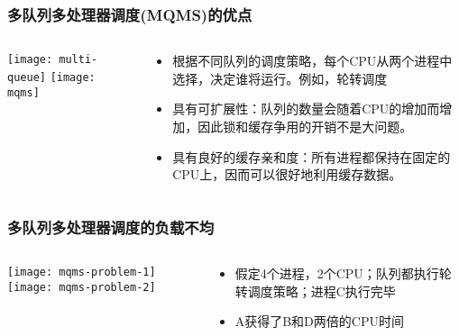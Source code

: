 \begin{frame}
    \frametitle{多队列多处理器调度(MQMS)的优点}
	\begin{columns}
		\begin{column}{.5\textwidth}
			\Large \centering
			\texttt{[image: multi-queue]}
			\texttt{[image: mqms]}	
		\end{column}
		
		\begin{column}{.5\textwidth}
			\large
			\normalsize
			\begin{itemize}
			\item 根据不同队列的调度策略，每个CPU从两个进程中选择，决定谁将运行。例如，轮转调度
			\item 具有可扩展性：队列的数量会随着CPU的增加而增加，因此锁和缓存争用的开销不是大问题。
			\item 具有良好的缓存亲和度：所有进程都保持在固定的CPU上，因而可以很好地利用缓存数据。
			\end{itemize}
		\end{column}
	\end{columns}
\end{frame}


\begin{frame}
    \frametitle{多队列多处理器调度的负载不均}
	\begin{columns}
		\begin{column}{.5\textwidth}
			\Large \centering
			\texttt{[image: mqms-problem-1]}
			\texttt{[image: mqms-problem-2]}	
		\end{column}
		
		\begin{column}{.5\textwidth}
			\large
			\normalsize
			
			\begin{itemize}
				\item 假定4个进程，2个CPU；队列都执行轮转调度策略；进程C执行完毕
			\item  A获得了B和D两倍的CPU时间

			\end{itemize}
		\end{column}
	\end{columns}
\end{frame}

